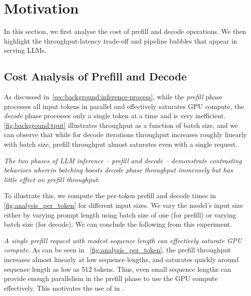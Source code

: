 


\section{Motivation}
\label{sec:motivation}


In this section, we first analyse the cost of prefill and decode operations. We then highlight the throughput-latency trade-off and pipeline bubbles that appear in serving LLMs.

\subsection{Cost Analysis of Prefill and Decode}
\label{sec:analysis:throughput}




As discussed in~\autoref{sec:background:inference-process}, while the \textit{prefill} phase processes all input tokens in parallel and effectively saturates GPU compute, the \textit{decode} phase processes only a single token at a time and is very inefficient. \autoref{fig:background:tput} illustrates throughput as a function of batch size, and we can observe that while for decode iterations throughput increases roughly linearly with batch size, prefill throughput almost saturates even with a single request.

 \textit{The two phases of LLM inference -- prefill and decode -- demonstrate contrasting behaviors wherein batching boosts decode phase throughput immensely but has little effect on prefill throughput.}



\if
To illustrate this, we compute the per-token prefill and decode times in \autoref{fig:analysis_per_token} for different input sizes. We vary the model's input size either by varying prompt length using batch size of one (for prefill) or varying batch size (for decode). We can conclude the following from this experiment.


 \textit{A single prefill request with modest sequence length can effectively saturate GPU compute}. As can be seen in ~\autoref{fig:analysis_per_token}, the prefill throughput increases almost linearly at low sequence lengths, and saturates quickly around sequence length as low as 512 tokens. Thus, even small sequence lengths can provide enough parallelism in the prefill phase to use the GPU compute effectively. This motivates the use of \chunking in \sysname.



